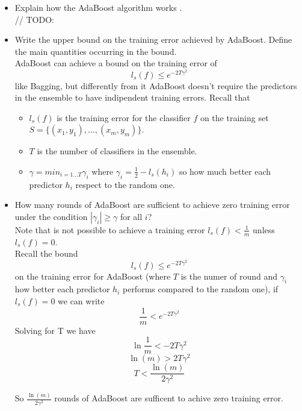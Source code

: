 \begin{itemize}
    \item Explain how the AdaBoost algorithm works  .\\
        
        // TODO:
        
    \item Write the upper bound on the training error achieved by AdaBoost. Define the main quantities occurring in the bound.\\
        
        AdaBoost can achieve a bound on the training error of $$l_s(f) \leq e^{-2T\gamma^2}$$ like Bagging, but differently from it AdaBoost doesn't 
        require the predictors in the ensemble to have indipendent training errors. 
        Recall that 
        \begin{itemize}
            \item $l_s(f)$ is the training error for the classifier $f$ on the training set $S = \{(x_1 , y_1),\dots,(x_m , y_m)\}$.\\
            \item $T$ is the number of classifiers in the ensemble.\\
            \item $\gamma = min_{i=1 \dots T} \gamma_i$ where  $\gamma_i = \frac{1}{2} - l_s(h_i)$ so how much better each predictor $h_i$ respect to the random one.\\
        \end{itemize}
        
    \item How many rounds of AdaBoost are sufficient to achieve zero training error under the condition $|\gamma_i| \geq \gamma$ for all $i$?\\
        
        Note that is not possible to achieve a training error $l_s(f) < \frac{1}{m}$ unless $l_s(f) = 0$.\\
        Recall the bound $$l_s(f) \leq e^{-2T\gamma^2}$$ on the training error for AdaBoost (where $T$ is the numer of round and $\gamma_i$ how better 
        each predictor $h_i$ performs compared to the random one), 
        if $l_s(f) = 0$ we can write $$\frac{1}{m} < e^{-2T\gamma^2}$$
        Solving for T we have
        $$\ln{\frac{1}{m}} < -2T\gamma^2$$
        $$\ln(m) > 2T\gamma^2$$
        $$T < \frac{\ln(m)}{2\gamma^2}$$

        So $\frac{\ln(m)}{2\gamma^2}$ rounds of AdaBoost are sufficent to achive zero training error.
        
    \end{itemize}
    